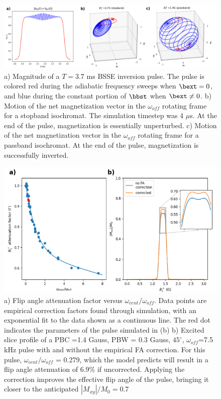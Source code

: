 \begin{figure}[h]
\centering
\includegraphics[width=1.1\textwidth]{figures/trajectory_figure.png}
\caption{a) Magnitude of a $T = 3.7$ ms BSSE inversion pulse. 
The pulse is colored red during the adiabatic frequency sweeps when $\bext = 0$, and blue during the constant portion of $\bbst$ when $\bext \neq 0$.
b) Motion of the net magnetization vector in the $\omega_{off}$ rotating frame for a stopband isochromat. 
The simulation timestep was 4 $\mu$s. At the end of the pulse, magnetization is essentially unperturbed.
c) Motion of the net magnetization vector in the $\omega_{off}$ rotating frame for a passband isochromat. 
At the end of the pulse, magnetization is successfully inverted.}
\label{fig:motion}
\end{figure}

\begin{figure}[h]
\centering
\includegraphics[width=1.\textwidth]{figures/correction_fact_processed_fa_only.png}
\caption{a) Flip angle attenuation factor versus $ \omega_{cent}/\omega_{off}$.
Data points are empirical correction factors found through simulation, 
with an exponential fit to the data shown as a continuous line. 
The red dot indicates the parameters of the pulse simulated in (b)
b) Excited slice profile of a PBC =1.4 Gauss, PBW = 0.3 Gauss, 
$45^\circ$, $\omega_{off}$=7.5 kHz pulse with and without the empirical FA correction. For this pulse, $\omega_{cent}/\omega_{off}$ = 0.279, which the model predicts will result in a flip angle attenuation of $6.9\%$ if uncorrected.
Applying the correction improves the effective flip angle of the pulse, bringing it closer to the anticipated $|M_{xy}|/M_0 = 0.7$
}
\label{fig:corrs}
\end{figure}

